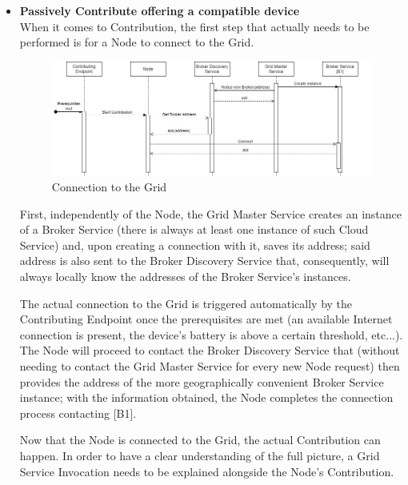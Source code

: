 \begin{itemize}
\begin{itemize}
    \end{itemize}

    \item \textbf{Passively Contribute offering a compatible device}\\
    When it comes to Contribution, the first step that actually needs to be performed is for a Node to connect to the Grid.
    \vspace{12mm}
    \begin{figure}[!ht]
        \centering
        \includegraphics[width=\linewidth]{document/chapters/chapter_6/images/use_cases_satisfaction_node_grid_connection.jpg}
        \caption{Connection to the Grid}
        \label{fig:use_cases_satisfaction_node_grid_connection}
    \end{figure}
    \vspace{5mm}

    First, independently of the Node, the Grid Master Service creates an instance of a Broker Service (there is always at least one instance of such Cloud Service) and, upon creating a connection with it, saves its address; said address is also sent to the Broker Discovery Service that, consequently, will always locally know the addresses of the Broker Service's instances.

    The actual connection to the Grid is triggered automatically by the Contributing Endpoint once the prerequisites are met (an available Internet connection is present, the device's battery is above a certain threshold, etc...). The Node will proceed to contact the Broker Discovery Service that (without needing to contact the Grid Master Service for every new Node request) then provides the address of the more geographically convenient Broker Service instance; with the information obtained, the Node completes the connection process contacting [B1]. 

    Now that the Node is connected to the Grid, the actual Contribution can happen. In order to have a clear understanding of the full picture, a Grid Service Invocation needs to be explained alongside the Node's Contribution.
    \vspace{10mm}


\end{itemize}
